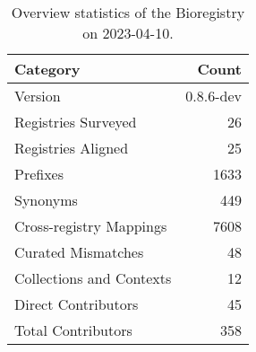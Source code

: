 \begin{table}
\caption{Overview statistics of the Bioregistry on 2023-04-10.}
\label{tab:bioregistry-summary}
\begin{tabular}{lr}
\toprule
Category & Count \\
\midrule
Version & 0.8.6-dev \\
Registries Surveyed & 26 \\
Registries Aligned & 25 \\
Prefixes & 1633 \\
Synonyms & 449 \\
Cross-registry Mappings & 7608 \\
Curated Mismatches & 48 \\
Collections and Contexts & 12 \\
Direct Contributors & 45 \\
Total Contributors & 358 \\
\bottomrule
\end{tabular}
\end{table}
